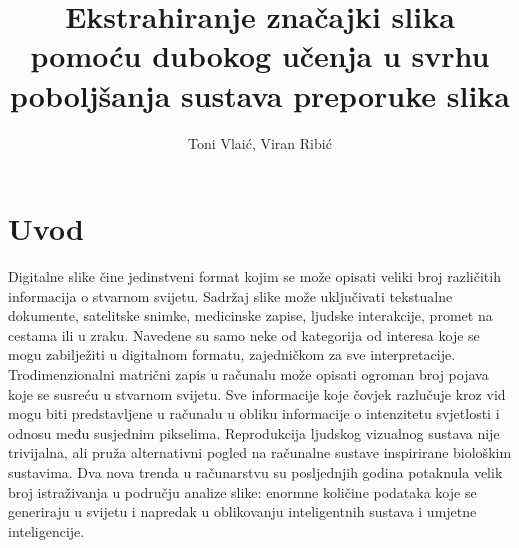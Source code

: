 \documentclass[times, utf8, proizvoljni, numeric]{fer}
\begin{document}
\title{Ekstrahiranje značajki slika pomoću dubokog učenja u svrhu poboljšanja sustava preporuke slika}
\author{Toni Vlaić, Viran Ribić}

\maketitle

\thispagestyle{empty}

\tableofcontents
\thispagestyle{empty}
\listoftables
\thispagestyle{empty}
\listoffigures
\thispagestyle{empty}


\chapter{Uvod}


Digitalne slike čine jedinstveni format kojim se može opisati veliki broj različitih informacija o stvarnom svijetu. Sadržaj slike može uključivati tekstualne dokumente, satelitske snimke, medicinske zapise, ljudske interakcije, promet na cestama ili u zraku. Navedene su samo neke od kategorija od interesa koje se mogu zabilježiti u digitalnom formatu, zajedničkom za sve interpretacije. Trodimenzionalni matrični zapis u računalu može opisati ogroman broj pojava koje se susreću u stvarnom svijetu. Sve informacije koje čovjek razlučuje kroz vid mogu biti predstavljene u računalu u obliku informacije o intenzitetu svjetlosti i odnosu među susjednim pikselima. Reprodukcija ljudskog vizualnog sustava nije trivijalna, ali pruža alternativni pogled na računalne sustave inspirirane biološkim sustavima. Dva nova trenda u računarstvu su posljednjih godina potaknula velik broj istraživanja u području analize slike: enormne količine podataka koje se generiraju u svijetu i napredak u oblikovanju inteligentnih sustava i umjetne inteligencije. 
\end{document}
